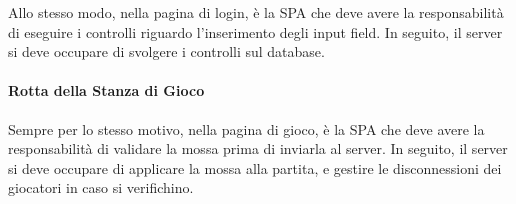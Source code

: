 Allo stesso modo, nella pagina di login, è la SPA che deve avere la responsabilità di eseguire i controlli riguardo l'inserimento degli input field. In seguito, il server si deve occupare di svolgere i controlli sul database.

\paragraph{Rotta della Stanza di Gioco \paragraphNewline}

\removeHorizontalSpaceSmall Sempre per lo stesso motivo, nella pagina di gioco, è la SPA che deve avere la responsabilità di validare la mossa prima di inviarla al server. In seguito, il server si deve occupare di applicare la mossa alla partita, e gestire le disconnessioni dei giocatori in caso si verifichino.

\newpage